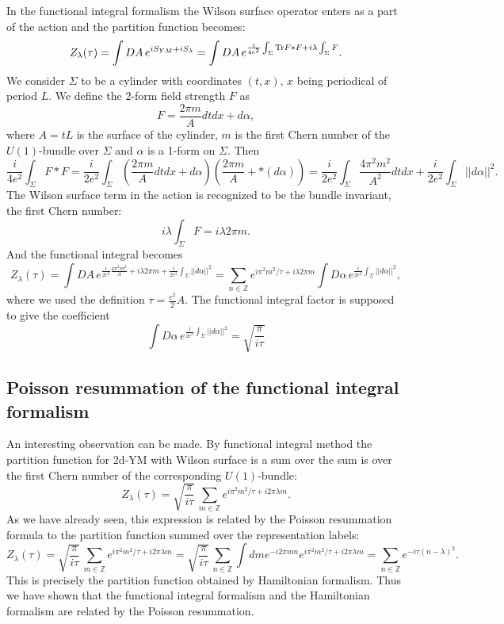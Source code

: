 \documentclass[11pt]{report}
\theoremstyle{plain}
\theoremstyle{definition}
\theoremstyle{remark}
\theoremstyle{remark}
\numberwithin{equation}{section}
\begin{document}
In the functional integral formalism the Wilson surface operator enters as a part of the action and the partition function becomes:
%
$$
Z_{\lambda}(\tau) = \int DA \, e^{iS_{YM} + iS_{\lambda}} = 
\int DA  \, e^{ \frac{i}{4e^2} \int_{\Sigma} {\rm Tr} F \ast F + i\lambda \int_{\Sigma} F }.
$$
We consider $\Sigma$ to be a cylinder with coordinates $(t, x)$, $x$ being periodical of period $L$. 
We define the 2-form field strength $F$ as
%
$$
F=\frac{2\pi m}{A}dtdx + d\alpha,
$$
where $A=tL$ is the surface of the cylinder, $m$ is the first Chern number of the $U(1)$-bundle over $\Sigma$ and $\alpha$ is a 1-form on $\Sigma$. 
Then 
%
$$
\frac{i}{4e^2}\int_{\Sigma} F\ast F = \frac{i}{2e^2}\int_{\Sigma} (\frac{2\pi m}{A}dtdx + d\alpha)(\frac{2\pi m}{A} + \ast (d\alpha)) = \frac{i}{2e^2}\int_{\Sigma} \frac{4\pi^2m^2}{A^2}dtdx + \frac{i}{2e^2}\int_{\Sigma} ||d\alpha ||^2.
$$
The Wilson surface term in the action is recognized to be the bundle invariant, the first Chern number:
%
$$
i\lambda \int_{\Sigma} F = i\lambda 2\pi m.
$$
And the functional integral becomes
%
$$
Z_{\lambda}(\tau) = \int DA \, e^{\frac{i}{2e^2} \frac{4\pi^2m^2}{A} +  i\lambda 2\pi m + \frac{i}{2e^2}\int_{\Sigma} ||d\alpha ||^2} = \sum_{n\in\mathbb{Z}} e^{i \pi^2m^2/\tau +  i\lambda 2\pi m} \int D\alpha \, e^{\frac{i}{2e^2}\int_{\Sigma} ||d\alpha ||^2},
$$
where we used the definition $\tau = \frac{e^2}{2}A$.
The functional integral factor is supposed to give the coefficient 
%
$$
\int D\alpha \, e^{\frac{i}{2e^2}\int_{\Sigma} ||d\alpha ||^2} = \sqrt{\frac{\pi}{i\tau}}
$$

\subsection{Poisson resummation of the functional integral formalism}

An interesting observation can be made. By functional integral method the partition function for 2d-YM with Wilson surface is a sum over the sum is over the first Chern number of the corresponding $U(1)$-bundle:
%
$$
Z_\lambda(\tau) = \sqrt{\frac{\pi}{i\tau}} \, \sum_{m \in \mathbb{Z}} e^{ i\pi^2m^2/\tau + i 2\pi \lambda m}.
$$
As we have already seen, this expression is related by the Poisson resummation formula to the partition function summed over the representation labels:
%
$$
Z_\lambda(\tau) = \sqrt{\frac{\pi}{i\tau}} \, \sum_{m \in \mathbb{Z}} e^{ i\pi^2m^2/\tau + i 2\pi \lambda m} =\sqrt{\frac{\pi}{i\tau}} \, \sum_{n \in \mathbb{Z}} \int dm e^{-i2\pi mn} e^{ i\pi^2m^2/\tau + i 2\pi \lambda m} = \sum_{n \in \mathbb{Z}} e^{-i\tau (n-\lambda)^2}.
$$
This is precisely the partition function obtained by Hamiltonian formalism. 
Thus we have shown that the functional integral formalism and the Hamiltonian formalism are related by the Poisson resummation.
\end{document}
